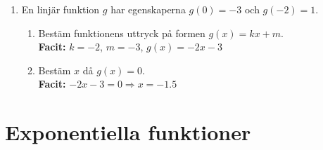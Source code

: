 \documentclass[a4paper,11pt]{article}
\begin{document}
\begin{enumerate}[label=\textbf{\arabic*.}]
    \item En linjär funktion $g$ har egenskaperna $g(0) = -3$ och $g(-2) = 1$.
    \begin{enumerate}[label=\alph*)]
        \item Bestäm funktionens uttryck på formen $g(x) = kx + m$.
        \\ \textbf{Facit:} $k=-2$, $m=-3$, $g(x)=-2x-3$
        \item Bestäm $x$ då $g(x) = 0$.
        \\ \textbf{Facit:} $-2x-3=0 \Rightarrow x=-1.5$
    \end{enumerate}
\end{enumerate}

\newpage
\section*{Exponentiella funktioner}
\end{document}

